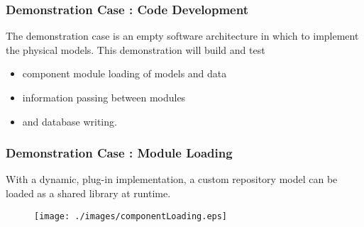 
\begin{frame}[ctb!]
  \frametitle{Demonstration Case : Code Development}
  The demonstration case is an empty software architecture in which to implement 
  the physical models. This demonstration will build and test
  \begin{itemize}
    \item component module loading of models and data
    \item information passing between modules
    \item and database writing.
  \end{itemize}
\end{frame}

\begin{frame}[ctb!]
  \frametitle{Demonstration Case : Module Loading}
  With a dynamic, plug-in implementation,  a custom
  repository model can be loaded as a shared library at runtime. 

  \begin{figure}[htbp!]
    \begin{center}
      \texttt{[image: ./images/componentLoading.eps]}
    \end{center}
  \end{figure}

\end{frame}

